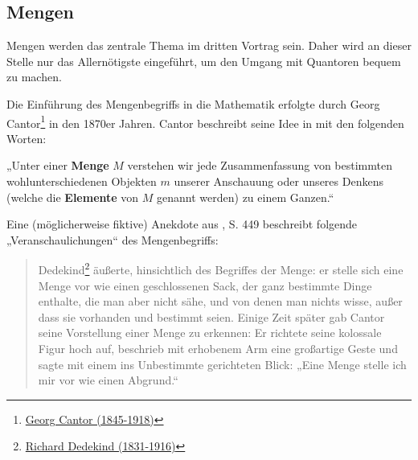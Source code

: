 \subsection*{Mengen}


Mengen werden das zentrale Thema im dritten Vortrag sein. Daher wird an dieser Stelle nur das Allernötigste eingeführt, um den Umgang mit Quantoren bequem zu machen.

Die Einführung des Mengenbegriffs in die Mathematik erfolgte durch Georg Cantor\footnote{\href{https://de.wikipedia.org/wiki/Georg_Cantor}{Georg Cantor (1845-1918)}} in den 1870er Jahren. Cantor beschreibt seine Idee in \cite{Can95} mit den folgenden Worten:


\begin{de} \label{mengenimlogikkapitel}
    „Unter einer \textbf{Menge} $M$ verstehen wir jede Zusammenfassung von bestimmten wohlunterschiedenen Objekten $m$ unserer Anschauung oder unseres Denkens (welche die \textbf{Elemente} von $M$ genannt werden) zu einem Ganzen.“
\end{de}


\begin{bem}
    Eine (möglicherweise fiktive) Anekdote aus \cite{Ded32}, S. 449 beschreibt folgende „Veranschaulichungen“ des Mengenbegriffs:
    \begin{quote}
        Dedekind\footnote{\href{https://de.wikipedia.org/wiki/Richard_Dedekind}{Richard Dedekind (1831-1916)}} äußerte, hinsichtlich des Begriffes der Menge: er stelle sich eine Menge vor wie einen geschlossenen Sack, der ganz bestimmte Dinge enthalte, die man aber nicht sähe, und von denen man nichts wisse, außer dass sie vorhanden und bestimmt seien. Einige Zeit später gab Cantor seine Vorstellung einer Menge zu erkennen: Er richtete seine kolossale Figur hoch auf, beschrieb mit erhobenem Arm eine großartige Geste und sagte mit einem ins Unbestimmte gerichteten Blick: „Eine Menge stelle ich mir vor wie einen Abgrund.“
    \end{quote}
\end{bem}


\begin{comment}
\begin{de} \label{mengenimlogikkapitel} \index{Menge}
    Eine \textbf{Menge} ist eine Gesamtheit von Dingen und als solche selbst wiederum eine Art Gegenstand. Sie ist allein dadurch bestimmt, welche Dinge ihr angehören. Diejenigen Objekte, die einer Menge angehören, werden ihre \textbf{Elemente} genannt. Für ein Objekt $a$ und eine Menge $M$ ergibt es nur Sinn, zu fragen, \emph{ob} $a$ ein Element von $M$ ist -- dagegen ergäbe es keinen Sinn, danach zu fragen, „an welcher Stelle“ oder „wie oft“ $a$ ein Element von $M$ wäre.
\end{de}
\end{comment}



